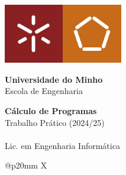 \begin{titlepage}
\includegraphics[width=26mm]{cp2425t_media/UM.jpg}\includegraphics[width=26mm]{cp2425t_media/EE.jpg}

\vspace{7mm}
\leading{17pt}
{\Large
\textbf{Universidade do Minho}
\\
{\selectfont
Escola de Engenharia
}}

\vspace{50mm}
\leading{27pt}
{\huge
\textbf{Cálculo de Programas}
\\
Trabalho Prático (2024/25)}
\\
%
\\
{\LARGE
Lic. em Engenharia Informática}

\vspace{50mm}
\leading{15pt}
{\Large
\begin{tabularx}{\textwidth}{@{}p{20mm} X}
     \\
     \\
    \thestudentA \\
    \thestudentB \\
    \thestudentC \\
\end{tabularx}
}

\vspace*{\fill}
{\large \myear}
\end{titlepage}
